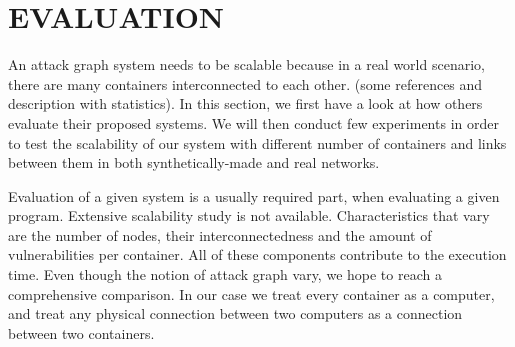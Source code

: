 \documentclass[letterpaper, 10 pt, conference]{ieeeconf}  %
\begin{document}
\section{EVALUATION}

An attack graph system needs to be scalable because in a real world scenario, there are many containers interconnected to each other. (some references and description with statistics). In this section, we first have a look at how others evaluate their proposed systems. We will then conduct few experiments in order to test the scalability of our system with different number of containers and links between them in both synthetically-made and real networks.

Evaluation of a given system is a usually required part, when evaluating a given program. Extensive scalability study is not available. Characteristics that vary are the number of nodes, their interconnectedness and the amount of vulnerabilities per container. All of these components contribute to the execution time. Even though the notion of attack graph vary, we hope to reach a comprehensive comparison. In our case we treat every container as a computer, and treat any physical connection between two computers as a connection between two containers. 
\end{document}

